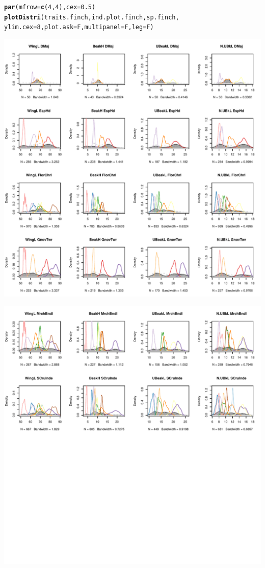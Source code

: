 \documentclass[12pt]{article}\usepackage[]{graphicx}\usepackage[]{color}
\makeatletter
\def\maxwidth{ %
  \ifdim\Gin@nat@width>\linewidth
    \linewidth
  \else
    \Gin@nat@width
  \fi
}
\newcommand{\hlnum}[1]{\textcolor[rgb]{0.686,0.059,0.569}{#1}}%
\newcommand{\hlstd}[1]{\textcolor[rgb]{0.345,0.345,0.345}{#1}}%
\newcommand{\hlkwc}[1]{\textcolor[rgb]{0.333,0.667,0.333}{#1}}%
\newcommand{\hlkwd}[1]{\textcolor[rgb]{0.737,0.353,0.396}{\textbf{#1}}}%
\newenvironment{kframe}{%
 \def\at@end@of@kframe{}%
 \ifinner\ifhmode%
  \def\at@end@of@kframe{\end{minipage}}%
  \begin{minipage}{\columnwidth}%
 \fi\fi%
 \def\FrameCommand##1{\hskip\@totalleftmargin \hskip-\fboxsep
 \colorbox{shadecolor}{##1}\hskip-\fboxsep
     \hskip-\linewidth \hskip-\@totalleftmargin \hskip\columnwidth}%
 \MakeFramed {\advance\hsize-\width
   \@totalleftmargin\z@ \linewidth\hsize
   \@setminipage}}%
 {\par\unskip\endMakeFramed%
 \at@end@of@kframe}
\newenvironment{knitrout}{}{} %
\makeatother
\begin{document}
\begin{knitrout}
\color{fgcolor}\begin{kframe}
\begin{alltt}
\hlkwd{par}\hlstd{(}\hlkwc{mfrow} \hlstd{=} \hlkwd{c}\hlstd{(}\hlnum{4}\hlstd{,}\hlnum{4}\hlstd{),} \hlkwc{cex} \hlstd{=} \hlnum{0.5}\hlstd{)}
\hlkwd{plotDistri}\hlstd{(traits.finch, ind.plot.finch, sp.finch,}
      \hlkwc{ylim.cex} \hlstd{=} \hlnum{8}\hlstd{,} \hlkwc{plot.ask} \hlstd{= F,} \hlkwc{multipanel} \hlstd{= F,} \hlkwc{leg} \hlstd{= F)}
\end{alltt}
\end{kframe}
\includegraphics[width=\maxwidth]{figure/unnamed-chunk-111} 

\includegraphics[width=\maxwidth]{figure/unnamed-chunk-112} 


\end{knitrout}
\end{document}
